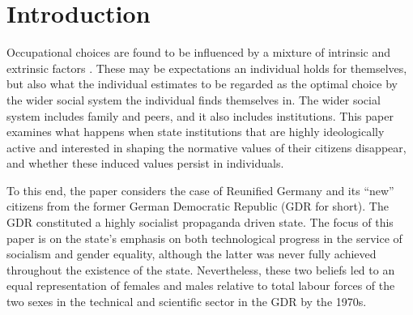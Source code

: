 \documentclass[a4paper, oneside, hyperfootnotes = false]{article}
\begin{document}
{{\begin{center}
\end{center}

}%

\newpage

\section{Introduction}
\label{intro}

Occupational choices are found to be influenced by a mixture of intrinsic and extrinsic factors \citep{Brennan2017, Morales2024}.
These may be expectations an individual holds for themselves, but also what the individual estimates to be regarded as the optimal choice by the wider social system the individual finds themselves in.
The wider social system includes family and peers, and it also includes institutions.
This paper examines what happens when state institutions that are highly ideologically active and interested in shaping the normative values of their citizens disappear, and whether these induced values persist in individuals.

To this end, the paper considers the case of Reunified Germany and its ``new'' citizens from the former German Democratic Republic (GDR for short). The GDR constituted a highly socialist propaganda driven state.
The focus of this paper is on the state's emphasis on both technological progress in the service of socialism and gender equality, although the latter was never fully achieved throughout the existence of the state.
Nevertheless, these two beliefs led to an equal representation of females and males relative to total labour forces of the two sexes in the technical and scientific sector in the GDR by the 1970s.

}
\end{document}
